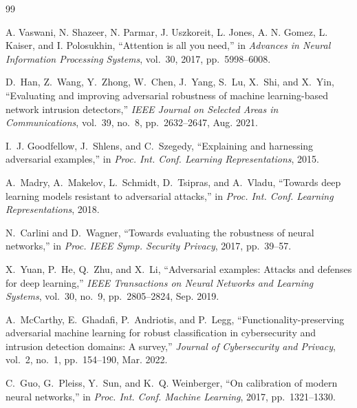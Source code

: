\documentclass[12pt,a4paper]{article}
\theoremstyle{definition}
\begin{document}
%
\begin{thebibliography}{99}

A. Vaswani, N. Shazeer, N. Parmar, J. Uszkoreit, L. Jones, A. N. Gomez, L. Kaiser, and I. Polosukhin, ``Attention is all you need,'' in \emph{Advances in Neural Information Processing Systems}, vol.~30, 2017, pp.~5998--6008.

D.~Han, Z.~Wang, Y.~Zhong, W.~Chen, J.~Yang, S.~Lu, X.~Shi, and X.~Yin, ``Evaluating and improving adversarial robustness of machine learning-based network intrusion detectors,'' \emph{IEEE Journal on Selected Areas in Communications}, vol.~39, no.~8, pp.~2632--2647, Aug. 2021.

I.~J. Goodfellow, J.~Shlens, and C.~Szegedy, ``Explaining and harnessing adversarial examples,'' in \emph{Proc. Int. Conf. Learning Representations}, 2015.

A.~Madry, A.~Makelov, L.~Schmidt, D.~Tsipras, and A.~Vladu, ``Towards deep learning models resistant to adversarial attacks,'' in \emph{Proc. Int. Conf. Learning Representations}, 2018.

N.~Carlini and D.~Wagner, ``Towards evaluating the robustness of neural networks,'' in \emph{Proc. IEEE Symp. Security Privacy}, 2017, pp.~39--57.

X.~Yuan, P.~He, Q.~Zhu, and X.~Li, ``Adversarial examples: Attacks and defenses for deep learning,'' \emph{IEEE Transactions on Neural Networks and Learning Systems}, vol.~30, no.~9, pp.~2805--2824, Sep. 2019.

A.~McCarthy, E.~Ghadafi, P.~Andriotis, and P.~Legg, ``Functionality-preserving adversarial machine learning for robust classification in cybersecurity and intrusion detection domains: A survey,'' \emph{Journal of Cybersecurity and Privacy}, vol.~2, no.~1, pp.~154--190, Mar. 2022.

C.~Guo, G.~Pleiss, Y.~Sun, and K.~Q. Weinberger, ``On calibration of modern neural networks,'' in \emph{Proc. Int. Conf. Machine Learning}, 2017, pp.~1321--1330.


\end{thebibliography}
\end{document}
